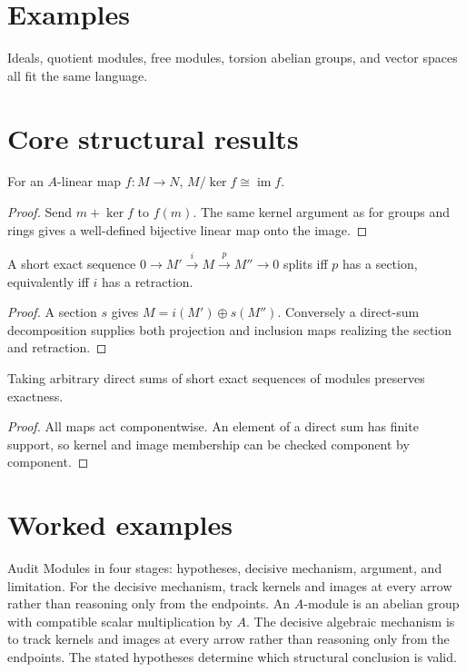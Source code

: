 \section{Examples}
Ideals, quotient modules, free modules, torsion abelian groups, and vector spaces all fit the same language.

\section{Core structural results}

\begin{theorem}\label{thm:v09-01}
For an $A$-linear map $f:M\to N$, $M/\ker f\cong\operatorname{im}f$.
\begin{proof}
Send $m+\ker f$ to $f(m)$. The same kernel argument as for groups and rings gives a well-defined bijective linear map onto the image.
\end{proof}
\end{theorem}

\begin{theorem}\label{thm:v09-02}
A short exact sequence $0\to M'\xrightarrow{i}M\xrightarrow{p}M''\to0$ splits iff $p$ has a section, equivalently iff $i$ has a retraction.
\begin{proof}
A section $s$ gives $M=i(M')\oplus s(M'')$. Conversely a direct-sum decomposition supplies both projection and inclusion maps realizing the section and retraction.
\end{proof}
\end{theorem}

\begin{theorem}\label{thm:v09-03}
Taking arbitrary direct sums of short exact sequences of modules preserves exactness.
\begin{proof}
All maps act componentwise. An element of a direct sum has finite support, so kernel and image membership can be checked component by component.
\end{proof}
\end{theorem}

\section{Worked examples}

\begin{example}\label{ex:v09-worked-01}
Audit Modules in four stages: hypotheses, decisive mechanism, argument, and limitation. For the decisive mechanism, track kernels and images at every arrow rather than reasoning only from the endpoints. An $A$-module is an abelian group with compatible scalar multiplication by $A$. The decisive algebraic mechanism is to track kernels and images at every arrow rather than reasoning only from the endpoints. The stated hypotheses determine which structural conclusion is valid.
\end{example}


